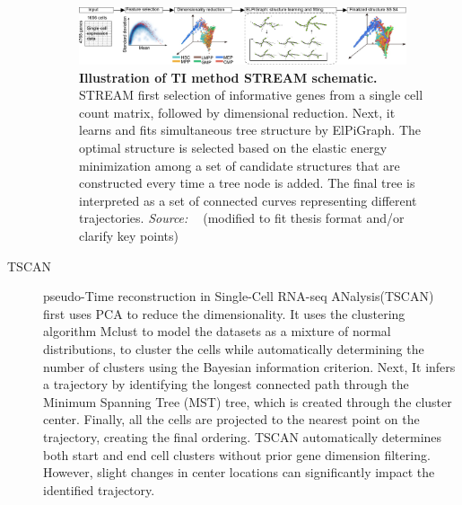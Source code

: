 \begin{description}
    \begin{figure}[ht!]
    	\centering
    	\includegraphics[width=0.95\textwidth]{TI_Alg_STREAM/fig}
    	\vspace{0.1cm}
    	\caption[Illustration of TI method STREAM schematic.]{\textbf{Illustration of TI method STREAM schematic.} STREAM first selection of informative genes from a single cell count matrix, followed by dimensional reduction. Next, it learns and fits simultaneous tree structure by ElPiGraph. The optimal structure is selected based on the elastic energy minimization among a set of candidate structures that are constructed every time a tree node is added. The final tree is interpreted as a set of connected curves representing different trajectories. \emph{Source: ~\cite{chen2019stream}} (modified to fit thesis format and/or clarify key points)
    	}
    	\label{fig:TI_Alg_STREAM}
    \end{figure}

    \item[TSCAN]
    pseudo-Time reconstruction in Single-Cell RNA-seq ANalysis(TSCAN) \citep{ji2016tscan} first uses PCA to reduce the dimensionality. It uses the clustering algorithm Mclust to model the datasets as a mixture of normal distributions, to cluster the cells while automatically determining the number of clusters using the Bayesian information criterion. Next, It infers a trajectory by identifying the longest connected path through the Minimum Spanning Tree (MST) tree, which is created through the cluster center. Finally, all the cells are projected to the nearest point on the trajectory, creating the final ordering. TSCAN automatically determines both start and end cell clusters without prior gene dimension filtering. However, slight changes in center locations can significantly impact the identified trajectory.


\end{description}
